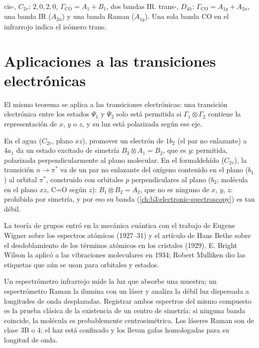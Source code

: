 \begin{example}\label{ex:b3:group-theory-applied:cis-trans}
cis-, $C_{2v}$:  $2, 0, 2, 0$, $\Gamma_{\mathrm{CO}} = A_1 + B_1$,
dos bandas IR. trans-, $D_{4h}$: $\Gamma_{\mathrm{CO}} = A_{1g} + A_{2u}$, una
banda IR ($A_{2u}$) y una banda Raman ($A_{1g}$). Una sola banda CO en el
infrarrojo indica el isómero trans.
\end{example}

\section{Aplicaciones a las transiciones electrónicas}

El mismo teorema se aplica a las transiciones electrónicas: una transición electrónica
entre los estados $\Psi_1$ y $\Psi_2$ solo está permitida si $\Gamma_1\otimes\Gamma_2$
contiene la representación de $x$, $y$ o $z$, y su luz está polarizada según
ese eje.

\begin{example}\label{ex:b3:group-theory-applied:electronic}
En el agua ($C_{2v}$, plano $xz$), promover un electrón de $1b_2$ (el par no enlazante)
a $4a_1$ da un estado excitado de simetría $B_2\otimes A_1 = B_2$, que es $y$:
permitida, polarizada perpendicularmente al plano molecular. En el formaldehído
($C_{2v}$), la transición $n\to\pi^*$ va de un par no enlazante del oxígeno contenido en el plano ($b_1$)
al orbital $\pi^*$, construido con orbitales $p$ perpendiculares al plano
($b_2$; molécula en el plano $xz$, C=O según $z$): $B_1\otimes B_2 = A_2$,
que no es ninguno de $x$, $y$, $z$: prohibida por simetría, y por eso su banda
(\cref{ch:b3:electronic-spectroscopy}) es tan débil.
\end{example}

\begin{history}
La teoría de grupos entró en la mecánica cuántica con el trabajo de Eugene Wigner sobre los espectros
atómicos (1927--31) y el artículo de Hans Bethe sobre el desdoblamiento de los términos atómicos en los
cristales (1929). E. Bright Wilson la aplicó a las vibraciones moleculares en
1934; Robert Mulliken dio las etiquetas que aún se usan para orbitales y estados.
\end{history}

\begin{inthelab}
Un espectrómetro infrarrojo mide la luz que absorbe una muestra; un espectrómetro
Raman la ilumina con un láser y analiza la débil luz dispersada
a longitudes de onda desplazadas. Registrar ambos espectros del mismo compuesto es la
prueba clásica de la existencia de un centro de simetría: si ninguna banda coincide, la molécula
es probablemente centrosimétrica. Los láseres Raman son de clase 3B o 4: el haz está
confinado y los  llevan gafas homologadas para su longitud de onda.
\end{inthelab}

